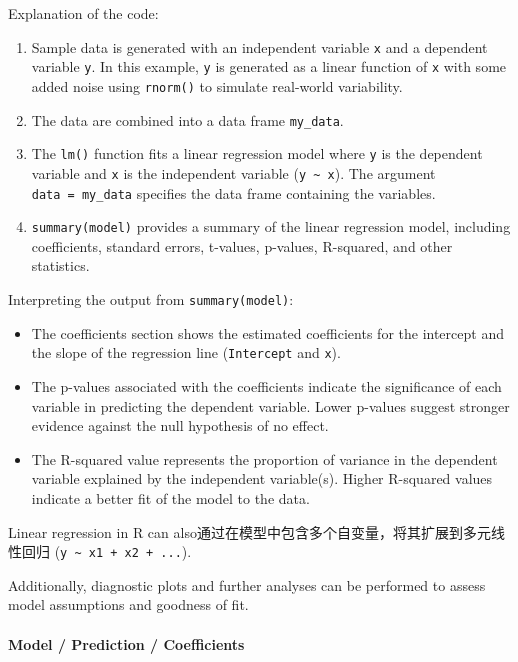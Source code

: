 \documentclass[
]{article}
\begin{document}
Explanation of the code:

\begin{enumerate}
\def\labelenumi{\arabic{enumi}.}
\item
  Sample data is generated with an independent variable \texttt{x} and a
  dependent variable \texttt{y}. In this example, \texttt{y} is
  generated as a linear function of \texttt{x} with some added noise
  using \texttt{rnorm()} to simulate real-world variability.
\item
  The data are combined into a data frame \texttt{my\_data}.
\item
  The \texttt{lm()} function fits a linear regression model where
  \texttt{y} is the dependent variable and \texttt{x} is the independent
  variable (\texttt{y\ \textasciitilde{}\ x}). The argument
  \texttt{data\ =\ my\_data} specifies the data frame containing the
  variables.
\item
  \texttt{summary(model)} provides a summary of the linear regression
  model, including coefficients, standard errors, t-values, p-values,
  R-squared, and other statistics.
\end{enumerate}

Interpreting the output from \texttt{summary(model)}:

\begin{itemize}
\item
  The coefficients section shows the estimated coefficients for the
  intercept and the slope of the regression line (\texttt{Intercept} and
  \texttt{x}).
\item
  The p-values associated with the coefficients indicate the
  significance of each variable in predicting the dependent variable.
  Lower p-values suggest stronger evidence against the null hypothesis
  of no effect.
\item
  The R-squared value represents the proportion of variance in the
  dependent variable explained by the independent variable(s). Higher
  R-squared values indicate a better fit of the model to the data.
\end{itemize}

Linear regression in R can
also通过在模型中包含多个自变量，将其扩展到多元线性回归
(\texttt{y\ \textasciitilde{}\ x1\ +\ x2\ +\ ...}).

Additionally, diagnostic plots and further analyses can be performed to
assess model assumptions and goodness of fit.

\hypertarget{model--prediction--coefficients}{%
\paragraph{Model / Prediction /
Coefficients}\label{model--prediction--coefficients}}
\end{document}
